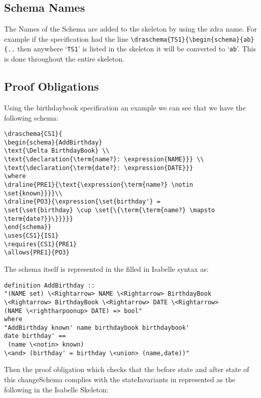 \subsection{Schema Names}

The Names of the Schema are added to the skeleton by using the \gls{zdra} name.
For example if the specification had the line
\verb|\draschema{TS1}{\begin{schema}{ab}{..| then anywhere `\texttt{TS1}' is
listed in the skeleton it will be converted to `\texttt{ab}'. This is done
throughout the entire skeleton.

\subsection{Proof Obligations}

Using the birthdaybook specification an example we can see that we have the
following schema:

\begin{verbatim}
\draschema{CS1}{
\begin{schema}{AddBirthday}
\text{\Delta BirthdayBook} \\
\text{\declaration{\term{name?}: \expression{NAME}}} \\
\text{\declaration{\term{date?}: \expression{DATE}}}
\where
\draline{PRE1}{\text{\expression{\term{name?} \notin 
\set{known}}}}\\
\draline{PO3}{\expression{\set{birthday'} =
\set{\set{birthday} \cup \set{\{\term{\term{name?} \mapsto 
\term{date?}}\}}}}}
\end{schema}}
\uses{CS1}{IS1}
\requires{CS1}{PRE1}
\allows{PRE1}{PO3}
\end{verbatim}

The schema itself is represented in the filled in Isabelle syntax as:

\begin{verbatim}
definition AddBirthday :: 
"(NAME set) \<Rightarrow> NAME \<Rightarrow> BirthdayBook 
\<Rightarrow> BirthdayBook \<Rightarrow> DATE \<Rightarrow> 
(NAME \<rightharpoonup> DATE) => bool"
where 
"AddBirthday known' name birthdaybook birthdaybook' 
date birthday' ==
 (name \<notin> known)
\<and> (birthday' = birthday \<union> (name,date))"
\end{verbatim}

Then the proof obligation which checks that the before state and after state of
this changeSchema complies with the stateInvariants in represented as the
following in the Isabelle Skeleton:

